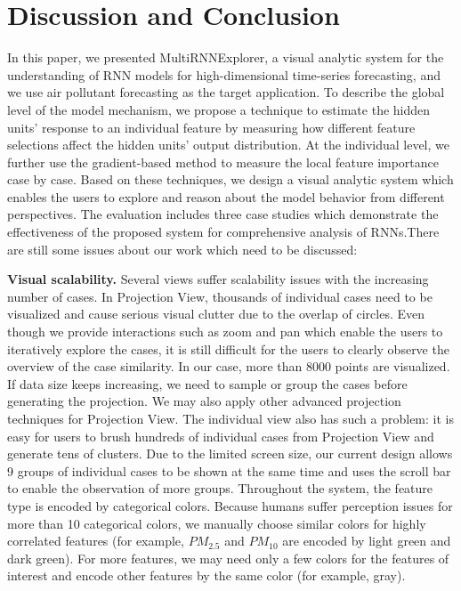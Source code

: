 \section{Discussion and Conclusion}

In this paper, we presented MultiRNNExplorer, a visual analytic system for the understanding of RNN models for high-dimensional time-series forecasting, and we use air pollutant forecasting as the target application. 
To describe the global level of the model mechanism, we propose a technique to estimate the hidden units' response to an individual feature by measuring how different feature selections affect the hidden units' output distribution. At the individual level, we further use the gradient-based method to measure the local feature importance case by case. Based on these techniques, we design a visual analytic system which enables the users to explore and reason about the model behavior from different perspectives. The evaluation includes three case studies which demonstrate the effectiveness of the proposed system for comprehensive analysis of RNNs.There are still some issues about our work which need to be discussed:

\textbf{Visual scalability.} Several views suffer scalability issues with the increasing number of cases. In Projection View, thousands of individual cases need to be visualized and cause serious visual clutter due to the overlap of circles.  Even though we provide interactions such as zoom and pan which enable the users to iteratively explore the cases, it is still difficult for the users to clearly observe the overview of the case similarity.  In our case, more than 8000 points are visualized. If data size keeps increasing, we need to sample or group the cases before generating the projection. We may also apply other advanced projection techniques\cite{van2017visual, pezzotti2016hierarchical} for Projection View. 
The individual view also has such a problem: it is easy for users to brush hundreds of individual cases from Projection View and generate tens of clusters. Due to the limited screen size, our current design allows 9 groups of individual cases to be shown at the same time and uses the scroll bar to enable the observation of more groups.
Throughout the system, the feature type is encoded by categorical colors. Because humans suffer perception issues for more than 10 categorical colors, we manually choose similar colors for highly correlated features (for example, $PM_{2.5}$ and $PM_{10}$ are encoded by light green and dark green). For more features, we may need only a few colors for the features of interest and encode other features by the same color (for example, gray). 


